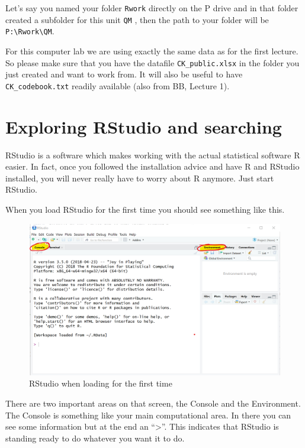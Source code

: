\documentclass[
]{article}
\begin{document}
Let's say you named your folder \texttt{Rwork} directly on the P drive
and in that folder created a subfolder for this unit \texttt{QM} , then
the path to your folder will be
\texttt{P:\textbackslash{}Rwork\textbackslash{}QM}.

For this computer lab we are using exactly the same data as for the
first lecture. So please make sure that you have the datafile
\texttt{CK\_public.xlsx} in the folder you just created and want to work
from. It will also be useful to have \texttt{CK\_codebook.txt} readily
available (also from BB, Lecture 1).

\hypertarget{exploring-rstudio-and-searching}{%
\section{Exploring RStudio and
searching}\label{exploring-rstudio-and-searching}}

RStudio is a software which makes working with the actual statistical
software R easier. In fact, once you followed the installation advice
and have R and RStudio installed, you will never really have to worry
about R anymore. Just start RStudio.

When you load RStudio for the first time you should see something like
this.

\begin{figure}
\centering
\includegraphics{RStudio_image0.png}
\caption{RStudio when loading for the first time}
\end{figure}

There are two important areas on that screen, the Console and the
Environment. The Console is something like your main computational area.
In there you can see some information but at the end an
``\textgreater{}''. This indicates that RStudio is standing ready to do
whatever you want it to do.
\end{document}
